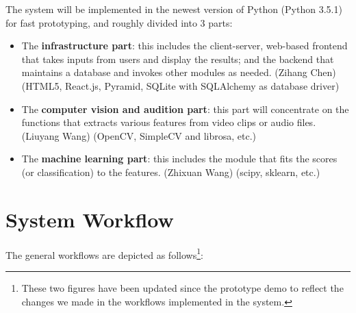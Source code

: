 \documentclass{report}
\begin{document}
The system will be implemented in the newest version of Python (Python 3.5.1) for fast prototyping, and roughly divided into 3 parts:
\begin{itemize}
\item The \textbf{infrastructure part}: this includes the client-server, web-based frontend that takes inputs from users and display the results; and the backend that maintains a database and invokes other modules as needed. (Zihang Chen) (HTML5, React.js, Pyramid, SQLite with SQLAlchemy as database driver)
\item The \textbf{computer vision and audition part}: this part will concentrate on the functions that extracts various features from video clips or audio files. (Liuyang Wang) (OpenCV, SimpleCV and librosa, etc.)
\item The \textbf{machine learning part}: this includes the module that fits the scores (or classification) to the features. (Zhixuan Wang) (scipy, sklearn, etc.)
\end{itemize}

\section{System Workflow}

The general workflows are depicted as follows\footnote{These two figures have been updated since the prototype demo to reflect the changes we made in the workflows implemented in the system.}:
\end{document}
